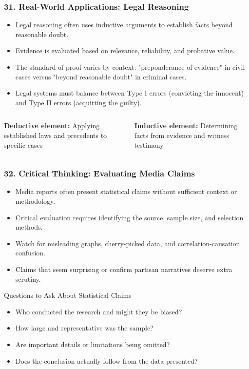 \documentclass{beamer}
\begin{document}
\begin{frame}
\frametitle{31. Real-World Applications: Legal Reasoning}
\begin{itemize}
\item Legal reasoning often uses inductive arguments to establish facts beyond reasonable doubt.
\item Evidence is evaluated based on relevance, reliability, and probative value.
\item The standard of proof varies by context: "preponderance of evidence" in civil cases versus "beyond reasonable doubt" in criminal cases.
\item Legal systems must balance between Type I errors (convicting the innocent) and Type II errors (acquitting the guilty).
\end{itemize}

\begin{columns}
\textbf{Deductive element:}
Applying established laws and precedents to specific cases

\textbf{Inductive element:}
Determining facts from evidence and witness testimony
\end{columns}
\end{frame}

\begin{frame}
\frametitle{32. Critical Thinking: Evaluating Media Claims}
\begin{itemize}
    \item Media reports often present statistical claims without sufficient context or methodology.
    \item Critical evaluation requires identifying the source, sample size, and selection methods.
    \item Watch for misleading graphs, cherry-picked data, and correlation-causation confusion.
    \item Claims that seem surprising or confirm partisan narratives deserve extra scrutiny.
\end{itemize}

\begin{alertblock}{Questions to Ask About Statistical Claims}
\begin{itemize}
    \item Who conducted the research and might they be biased?
    \item How large and representative was the sample?
    \item Are important details or limitations being omitted?
    \item Does the conclusion actually follow from the data presented?
\end{itemize}
\end{alertblock}
\end{frame}
\end{document}
